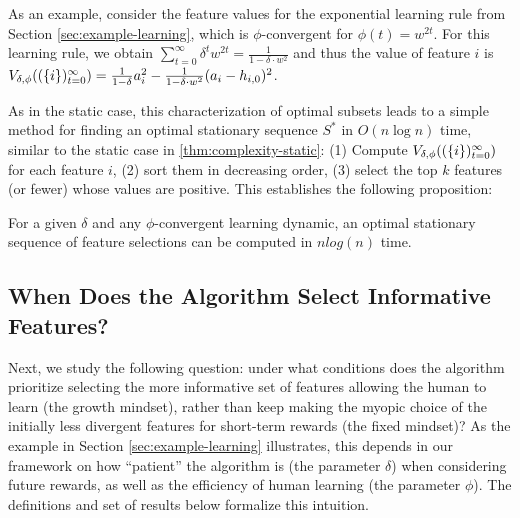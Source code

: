 As an example, consider the feature values for the exponential learning rule from Section \ref{sec:example-learning}, which is $\phi$-convergent for $\phi(t) = w^{2t}$. 
For this learning rule, 
we obtain $\sum_{t=0}^\infty \delta^t w^{2t} = \frac{1}{1-\delta \cdot w^2}$ and thus the value of feature $i$ is $V_{\delta,\phi}((\{i\})_{t=0}^\infty) = \frac{1}{1-\delta} a_i^2 -\frac{1}{1-\delta \cdot w^2} (a_i-h_{i,0})^2$.

As in the static case, this characterization of optimal subsets leads to a simple method for finding an optimal stationary sequence \( S^* \) in \( O(n \log n) \) time, similar to the static case in \cref{thm:complexity-static}: {(1) Compute $ V_{\delta,\phi}((\{i\})_{t=0}^\infty)$ for each feature $i$, (2) sort them in decreasing order, (3) select the top \( k \) features (or fewer) whose values are positive}. This establishes the following proposition:



\begin{proposition} \label{thm:complexity-learning}
For a given $\delta$ and any $\phi$-convergent learning dynamic, an optimal stationary sequence of feature selections can be computed in $n log(n)$ time.
\end{proposition}








\subsection{When Does the Algorithm Select Informative Features?}
\label{sec:tradeoff-analysis}

Next, we study the following question: under what conditions does the algorithm prioritize selecting the more informative set of features allowing the human to learn (the growth mindset), rather than keep making the myopic choice of the initially less divergent features for short-term rewards (the fixed mindset)? 
As the example in Section \ref{sec:example-learning} illustrates, this depends in our framework on how ``patient'' the algorithm is (the parameter $\delta$) when considering future rewards, as well as the efficiency of human learning (the parameter $\phi$). The definitions and set of results below formalize this intuition. 
